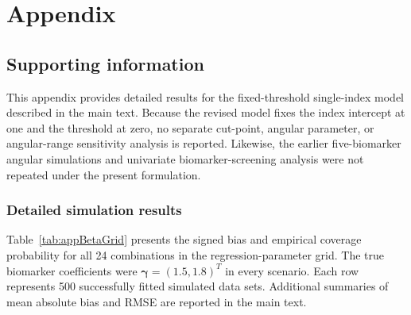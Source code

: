 \section{Appendix}

\subsection{Supporting information}
\label{appendixA}

This appendix provides detailed results for the fixed-threshold single-index
model described in the main text. Because the revised model fixes the index
intercept at one and the threshold at zero, no separate cut-point, angular
parameter, or angular-range sensitivity analysis is reported. Likewise, the
earlier five-biomarker angular simulations and univariate biomarker-screening
analysis were not repeated under the present formulation.

\subsubsection{Detailed simulation results}

Table~\ref{tab:appBetaGrid} presents the signed bias and empirical coverage
probability for all 24 combinations in the regression-parameter grid. The
true biomarker coefficients were
$\boldsymbol\gamma=(1.5,1.8)^{T}$ in every scenario. Each row represents 500
successfully fitted simulated data sets. Additional summaries of mean
absolute bias and RMSE are reported in the main text.

